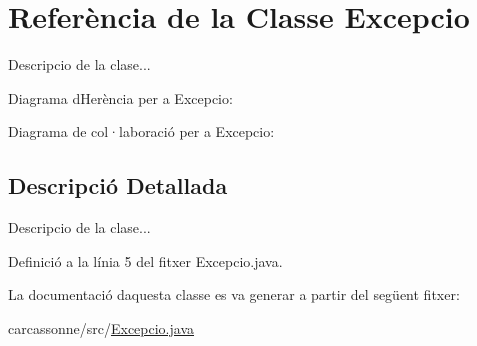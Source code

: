 \hypertarget{class_excepcio}{}\section{Referència de la Classe Excepcio}
\label{class_excepcio}


Descripcio de la clase...  




Diagrama d\textquotesingle{}Herència per a Excepcio\+:


Diagrama de col·laboració per a Excepcio\+:


\subsection{Descripció Detallada}
Descripcio de la clase... 

Definició a la línia 5 del fitxer Excepcio.\+java.



La documentació d\textquotesingle{}aquesta classe es va generar a partir del següent fitxer\+:\begin{DoxyCompactItemize}
\item 
carcassonne/src/\mbox{\hyperlink{_excepcio_8java}{Excepcio.\+java}}\end{DoxyCompactItemize}
